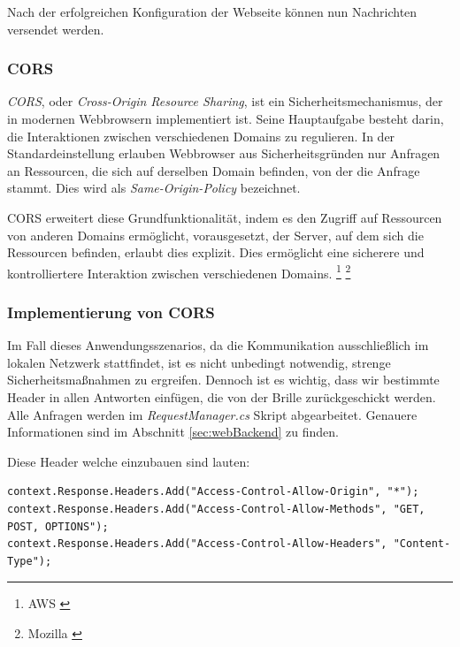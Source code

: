 Nach der erfolgreichen Konfiguration der Webseite können nun Nachrichten versendet werden.

\subsubsection{\label{sec:cors}CORS}
\textit{CORS}, oder \textit{Cross-Origin Resource Sharing}, ist ein Sicherheitsmechanismus, der in modernen Webbrowsern implementiert ist. Seine Hauptaufgabe besteht darin, die Interaktionen zwischen verschiedenen Domains zu regulieren. In der Standardeinstellung erlauben Webbrowser aus Sicherheitsgründen nur Anfragen an Ressourcen, die sich auf derselben Domain befinden, von der die Anfrage stammt. Dies wird als \textit{Same-Origin-Policy} bezeichnet.

CORS erweitert diese Grundfunktionalität, indem es den Zugriff auf Ressourcen von anderen Domains ermöglicht, vorausgesetzt, der Server, auf dem sich die Ressourcen befinden, erlaubt dies explizit. Dies ermöglicht eine sicherere und kontrolliertere Interaktion zwischen
verschiedenen Domains. \footnote{AWS \cite{CORS}} \footnote{Mozilla \cite{CORS-2}}

\subsubsection*{Implementierung von CORS}
Im Fall dieses Anwendungsszenarios, da die Kommunikation ausschließlich im lokalen Netzwerk stattfindet, ist es nicht unbedingt notwendig, strenge Sicherheitsmaßnahmen zu ergreifen. Dennoch ist es wichtig, dass wir bestimmte Header in allen Antworten einfügen, die von der Brille zurückgeschickt werden. Alle Anfragen werden im \textit{RequestManager.cs} Skript abgearbeitet. Genauere Informationen sind im Abschnitt \ref{sec:webBackend} zu finden.

Diese Header welche einzubauen sind lauten:

\begin{lstlisting}[style=csharp, label=code:CORS anfragen]
context.Response.Headers.Add("Access-Control-Allow-Origin", "*");
context.Response.Headers.Add("Access-Control-Allow-Methods", "GET, POST, OPTIONS");
context.Response.Headers.Add("Access-Control-Allow-Headers", "Content-Type");
\end{lstlisting}

